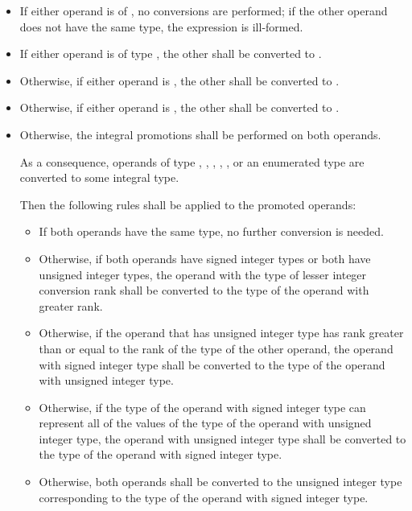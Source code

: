 \begin{itemize}
\item If either operand is of , no conversions
are performed; if the other operand does not have the same type, the expression is
ill-formed.

\item If either operand is of type , the
other shall be converted to .

\item Otherwise, if either operand is , the other shall be
converted to .

\item Otherwise, if either operand is , the other shall be
converted to .

\item Otherwise, the integral promotions shall be
performed on both operands.
\begin{footnote}
As a consequence, operands of type , , ,
, , or an enumerated type are converted
to some integral type.
\end{footnote}
Then the following rules shall be applied to the promoted operands:
\begin{itemize}

\item If both operands have the same type, no further conversion is
needed.

\item Otherwise, if both operands have signed integer types or both have
unsigned integer types, the operand with the type of lesser integer
conversion rank shall be converted to the type of the operand with
greater rank.

\item Otherwise, if the operand that has unsigned integer type has rank
greater than or equal to the rank of the type of the other operand, the
operand with signed integer type shall be converted to the type of the
operand with unsigned integer type.

\item Otherwise, if the type of the operand with signed integer type can
represent all of the values of the type of the operand with unsigned
integer type, the operand with unsigned integer type shall be converted
to the type of the operand with signed integer type.

\item Otherwise, both operands shall be converted to the unsigned
integer type corresponding to the type of the operand with signed
integer type.
\end{itemize}
\end{itemize}

